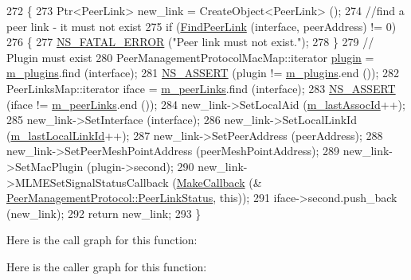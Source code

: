\begin{DoxyCode}
272 \{
273   Ptr<PeerLink> new\_link = CreateObject<PeerLink> ();
274   \textcolor{comment}{//find a peer link  - it must not exist}
275   \textcolor{keywordflow}{if} (\hyperlink{classns3_1_1dot11s_1_1PeerManagementProtocol_adc13cd9c290c7098d598af016b606133}{FindPeerLink} (interface, peerAddress) != 0)
276     \{
277       \hyperlink{group__fatal_ga5131d5e3f75d7d4cbfd706ac456fdc85}{NS\_FATAL\_ERROR} (\textcolor{stringliteral}{"Peer link must not exist."});
278     \}
279   \textcolor{comment}{// Plugin must exist}
280   PeerManagementProtocolMacMap::iterator \hyperlink{visualizer-ideas_8txt_a82212ee380150b652f4dad598413d06f}{plugin} = \hyperlink{classns3_1_1dot11s_1_1PeerManagementProtocol_a9000d20f6feb3db279a020b237f49d64}{m\_plugins}.find (interface);
281   \hyperlink{assert_8h_a6dccdb0de9b252f60088ce281c49d052}{NS\_ASSERT} (plugin != \hyperlink{classns3_1_1dot11s_1_1PeerManagementProtocol_a9000d20f6feb3db279a020b237f49d64}{m\_plugins}.end ());
282   PeerLinksMap::iterator iface = \hyperlink{classns3_1_1dot11s_1_1PeerManagementProtocol_aa4522af32720f04cfbb693adb2024c55}{m\_peerLinks}.find (interface);
283   \hyperlink{assert_8h_a6dccdb0de9b252f60088ce281c49d052}{NS\_ASSERT} (iface != \hyperlink{classns3_1_1dot11s_1_1PeerManagementProtocol_aa4522af32720f04cfbb693adb2024c55}{m\_peerLinks}.end ());
284   new\_link->SetLocalAid (\hyperlink{classns3_1_1dot11s_1_1PeerManagementProtocol_a675ea75c871f2436886b62d22821ffef}{m\_lastAssocId}++);
285   new\_link->SetInterface (interface);
286   new\_link->SetLocalLinkId (\hyperlink{classns3_1_1dot11s_1_1PeerManagementProtocol_ae06ce79f95d75c8a89b3d74d98ff8ee8}{m\_lastLocalLinkId}++);
287   new\_link->SetPeerAddress (peerAddress);
288   new\_link->SetPeerMeshPointAddress (peerMeshPointAddress);
289   new\_link->SetMacPlugin (plugin->second);
290   new\_link->MLMESetSignalStatusCallback (\hyperlink{group__makecallbackmemptr_ga9376283685aa99d204048d6a4b7610a4}{MakeCallback} (&
      \hyperlink{classns3_1_1dot11s_1_1PeerManagementProtocol_afffc33ac9aa647564a4449ba487a4cae}{PeerManagementProtocol::PeerLinkStatus}, \textcolor{keyword}{this}));
291   iface->second.push\_back (new\_link);
292   \textcolor{keywordflow}{return} new\_link;
293 \}
\end{DoxyCode}


Here is the call graph for this function\+:




Here is the caller graph for this function\+:


